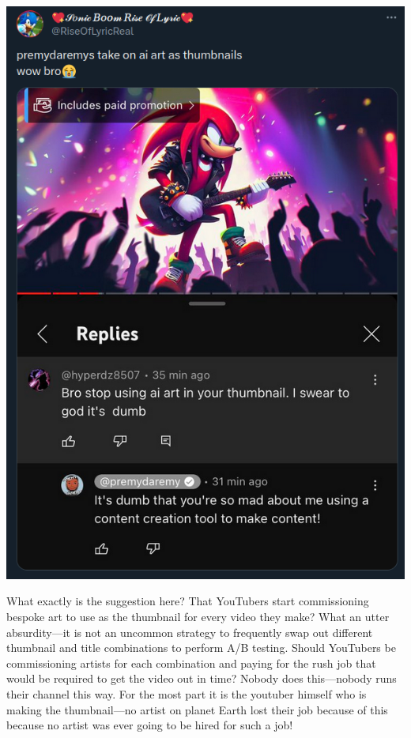 \documentclass[11pt]{article}
\begin{document}
\begin{center}
\includegraphics[width=.9\linewidth]{./images/bullying-premydaremy-thumbnail.png}
\end{center}

What exactly is the suggestion here? That YouTubers start commissioning bespoke art to use as the thumbnail for every video they make? What an utter absurdity---it is not an uncommon strategy to frequently swap out different thumbnail and title combinations to perform A/B testing. Should YouTubers be commissioning artists for each combination and paying for the rush job that would be required to get the video out in time? Nobody does this---nobody runs their channel this way. For the most part it is the youtuber himself who is making the thumbnail---no artist on planet Earth lost their job because of this because no artist was ever going to be hired for such a job!
\end{document}
